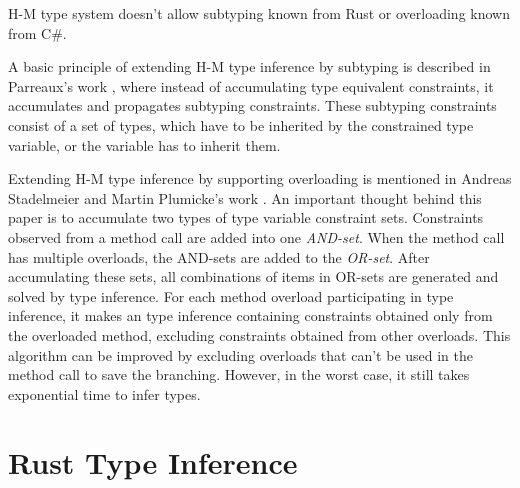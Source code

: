 H-M type system doesn't allow subtyping known from Rust or overloading known from C\#.  
\par
A basic principle of extending H-M type inference by subtyping is described in Parreaux's work \cite{paper:Parreaux}, where instead of accumulating type equivalent constraints, it accumulates and propagates subtyping constraints.
These subtyping constraints consist of a set of types, which have to be inherited by the constrained type variable, or the variable has to inherit them.
\par
Extending H-M type inference by supporting overloading is mentioned in Andreas Stadelmeier and Martin Plumicke's work \cite{paper:Overloading}.
An important thought behind this paper is to accumulate two types of type variable constraint sets.
Constraints observed from a method call are added into one \textit{AND-set}.
When the method call has multiple overloads, the AND-sets are added to the \textit{OR-set}.
After accumulating these sets, all combinations of items in OR-sets are generated and solved by type inference.
For each method overload participating in type inference, it makes an type inference containing constraints obtained only from the overloaded method, excluding constraints obtained from other overloads.
This algorithm can be improved by excluding overloads that can't be used in the method call to save the branching.
However, in the worst case, it still takes exponential time to infer types.

\section{Rust Type Inference}

